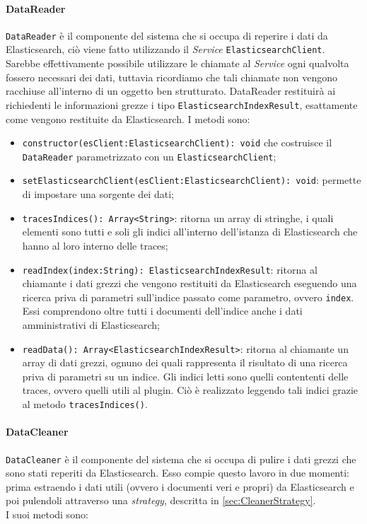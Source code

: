 \paragraph{DataReader} \Spazio
\label{sec:DataReader}
\texttt{DataReader} è il componente del sistema che si occupa di reperire i dati da Elasticsearch, ciò viene fatto utilizzando il \emph{Service} \texttt{ElasticsearchClient}. Sarebbe effettivamente possibile utilizzare le chiamate al \emph{Service} ogni qualvolta fossero necessari dei dati, tuttavia ricordiamo che tali chiamate non vengono racchiuse all'interno di un oggetto ben strutturato. DataReader restituirà ai richiedenti le informazioni grezze i tipo \texttt{ElasticsearchIndexResult}, esattamente come vengono restituite da Elasticsearch. I metodi sono:  

\begin{itemize} 
	\item \texttt{constructor(esClient:ElasticsearchClient): void} che costruisce il \texttt{DataReader} parametrizzato con un \texttt{ElasticsearchClient};
	\item \texttt{setElasticsearchClient(esClient:ElasticsearchClient): void}: permette di impostare una sorgente dei dati;
	\item \texttt{tracesIndices(): Array<String>}: ritorna un array di stringhe, i quali elementi sono tutti e soli gli indici all'interno dell'istanza di Elasticsearch che hanno al loro interno delle traces;
	\item \texttt{readIndex(index:String): ElasticsearchIndexResult}: ritorna al chiamante i dati grezzi che vengono restituiti da Elasticsearch eseguendo una ricerca priva di parametri sull'indice passato come parametro, ovvero \texttt{index}. Essi comprendono oltre tutti i documenti dell'indice anche i dati amministrativi di Elasticsearch;
	\item \texttt{readData(): Array<ElasticsearchIndexResult>}: ritorna al chiamante un array di dati grezzi, ognuno dei quali rappresenta il risultato di una ricerca priva di parametri su un indice. Gli indici letti sono quelli contententi delle traces, ovvero quelli utili al plugin. Ciò è realizzato leggendo tali indici grazie al metodo \texttt{tracesIndices()}.
\end{itemize}



\paragraph{DataCleaner}\Spazio
\label{sec:DataCleaner}
\texttt{DataCleaner} è il componente del sistema che si occupa di pulire i dati grezzi che sono stati reperiti da Elasticsearch. Esso compie questo lavoro in due momenti: prima estraendo i dati utili (ovvero i documenti veri e propri) da Elasticsearch e poi pulendoli attraverso una \emph{strategy}, descritta in \ref{sec:CleanerStrategy}.\\
I suoi metodi sono:


